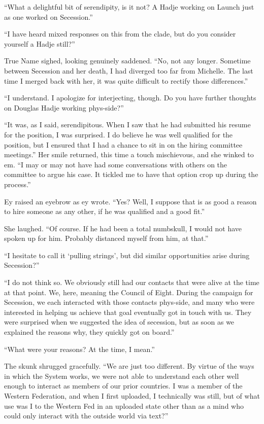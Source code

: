 ``What a delightful bit of serendipity, is it not? A Hadje working on Launch just as one worked on Secession.''

``I have heard mixed responses on this from the clade, but do you consider yourself a Hadje still?''

True Name sighed, looking genuinely saddened. ``No, not any longer. Sometime between Secession and her death, I had diverged too far from Michelle. The last time I merged back with her, it was quite difficult to rectify those differences.''

``I understand. I apologize for interjecting, though. Do you have further thoughts on Douglas Hadje working phys-side?''

``It was, as I said, serendipitous. When I saw that he had submitted his resume for the position, I was surprised. I do believe he was well qualified for the position, but I ensured that I had a chance to sit in on the hiring committee meetings.'' Her smile returned, this time a touch mischievous, and she winked to em. ``I may or may not have had some conversations with others on the committee to argue his case. It tickled me to have that option crop up during the process.''

Ey raised an eyebrow as ey wrote. ``Yes? Well, I suppose that is as good a reason to hire someone as any other, if he was qualified and a good fit.''

She laughed. ``Of course. If he had been a total numbskull, I would not have spoken up for him. Probably distanced myself from him, at that.''

``I hesitate to call it `pulling strings', but did similar opportunities arise during Secession?''

``I do not think so. We obviously still had our contacts that were alive at the time at that point. We, here, meaning the Council of Eight. During the campaign for Secession, we each interacted with those contacts phys-side, and many who were interested in helping us achieve that goal eventually got in touch with us. They were surprised when we suggested the idea of secession, but as soon as we explained the reasons why, they quickly got on board.''

``What were your reasons? At the time, I mean.''

The skunk shrugged gracefully. ``We are just too different. By virtue of the ways in which the System works, we were not able to understand each other well enough to interact as members of our prior countries. I was a member of the Western Federation, and when I first uploaded, I technically was still, but of what use was I to the Western Fed in an uploaded state other than as a mind who could only interact with the outside world via text?''

